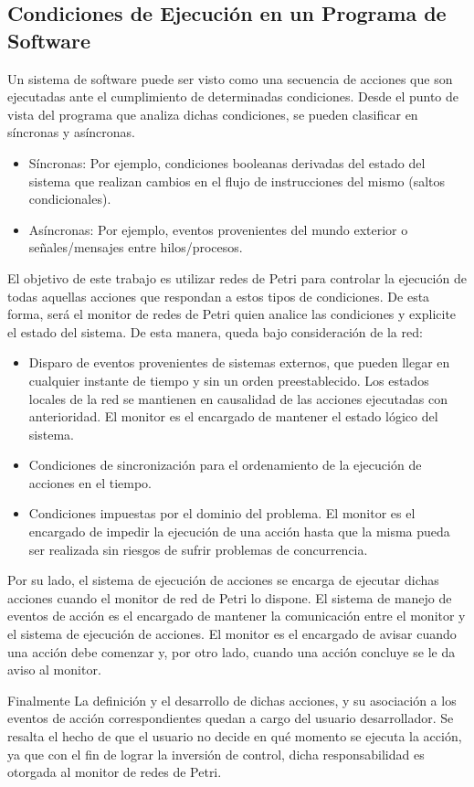 \subsection{Condiciones de Ejecución en un Programa de Software}
Un sistema de software puede ser visto como una secuencia de acciones que son
ejecutadas ante el cumplimiento de determinadas condiciones. Desde el punto de
vista del programa que analiza dichas condiciones, se pueden clasificar
en síncronas y asíncronas.
  \begin{itemize}
	\item Síncronas: Por ejemplo, condiciones booleanas derivadas del estado del
		sistema que realizan cambios en el flujo de instrucciones del mismo (saltos
		condicionales).
	\item Asíncronas: Por ejemplo, eventos provenientes del mundo exterior o
		señales/mensajes entre hilos/procesos.
  \end{itemize}
El objetivo de este trabajo es utilizar redes de Petri para controlar la
ejecución de todas aquellas acciones que respondan a estos tipos de condiciones.
De esta forma, será el monitor de redes de Petri quien analice las condiciones y
explicite el estado del sistema. De esta manera, queda bajo consideración de la red:
\begin{itemize}
  \item Disparo de eventos provenientes de sistemas externos, que pueden llegar
  en cualquier instante de tiempo y sin un orden preestablecido. Los estados
  locales de la red se mantienen en causalidad de las acciones ejecutadas con
  anterioridad. El monitor es el encargado de mantener el estado lógico del
  sistema.
  
  \item Condiciones de sincronización para el ordenamiento de la ejecución de
  acciones en el tiempo. 
  
  \item Condiciones impuestas por el dominio del problema. El monitor es el
  encargado de impedir la ejecución de una acción hasta que la misma pueda ser
  realizada sin riesgos de sufrir problemas de concurrencia.
\end{itemize}

Por su lado, el sistema de ejecución de acciones se encarga de ejecutar dichas acciones cuando
el monitor de red de Petri lo dispone. El sistema de manejo de eventos de acción
es el encargado de mantener la comunicación entre el monitor y el sistema de
ejecución de acciones. El monitor es el encargado de avisar cuando una acción
debe comenzar y, por otro lado, cuando una acción concluye se le da aviso al
monitor.

Finalmente La definición y el desarrollo de dichas acciones, y su
asociación a los eventos de acción correspondientes quedan a cargo del usuario
desarrollador. Se resalta el hecho de que el usuario no decide en qué momento se
ejecuta la acción, ya que con el fin de lograr la inversión de control,
dicha responsabilidad es otorgada al monitor de redes de Petri.

